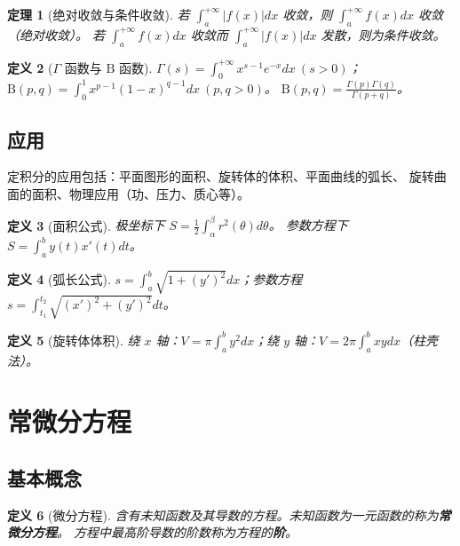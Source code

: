 \documentclass[12pt,a4paper]{ctexart}
\newtheorem{theorem}{定理}[section]
\newtheorem{definition}[theorem]{定义}
\theoremstyle{remark}
\begin{document}
\begin{theorem}[绝对收敛与条件收敛]
若 $\int_a^{+\infty} |f(x)| dx$ 收敛，则 $\int_a^{+\infty} f(x) dx$ 收敛（绝对收敛）。
若 $\int_a^{+\infty} f(x) dx$ 收敛而 $\int_a^{+\infty} |f(x)| dx$ 发散，则为条件收敛。
\end{theorem}

\begin{definition}[$\Gamma$ 函数与 $\mathrm{B}$ 函数]
$\Gamma(s) = \int_0^{+\infty} x^{s-1} e^{-x} dx\ (s > 0)$；
$\mathrm{B}(p,q) = \int_0^1 x^{p-1}(1-x)^{q-1} dx\ (p,q > 0)$。
$\mathrm{B}(p,q) = \frac{\Gamma(p)\Gamma(q)}{\Gamma(p+q)}$。
\end{definition}

\subsection{应用}

定积分的应用包括：平面图形的面积、旋转体的体积、平面曲线的弧长、
旋转曲面的面积、物理应用（功、压力、质心等）。

\begin{definition}[面积公式]
极坐标下 $S = \frac{1}{2}\int_{\alpha}^{\beta} r^2(\theta) d\theta$。
参数方程下 $S = \int_a^b y(t) x'(t) dt$。
\end{definition}

\begin{definition}[弧长公式]
$s = \int_a^b \sqrt{1+(y')^2} dx$；参数方程 $s = \int_{t_1}^{t_2} \sqrt{(x')^2+(y')^2} dt$。
\end{definition}

\begin{definition}[旋转体体积]
绕 $x$ 轴：$V = \pi \int_a^b y^2 dx$；绕 $y$ 轴：$V = 2\pi \int_a^b xy dx$（柱壳法）。
\end{definition}

\section{常微分方程}

\subsection{基本概念}

\begin{definition}[微分方程]
含有未知函数及其导数的方程。未知函数为一元函数的称为\textbf{常微分方程}。
方程中最高阶导数的阶数称为方程的\textbf{阶}。
\end{definition}
\end{document}

